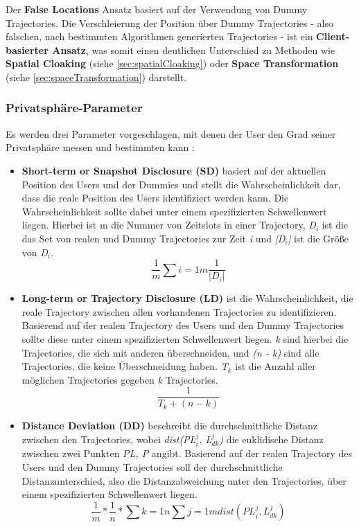Der \textbf{False Locations} Ansatz basiert auf der Verwendung von Dummy Trajectories. Die Verschleierung der Position über Dummy Trajectories - also falschen, nach bestimmten Algorithmen generierten Trajectories - ist ein \textbf{Client-basierter Ansatz}, was somit einen deutlichen Unterschied zu Methoden wie \textbf{Spatial Cloaking} (siehe \ref{sec:spatialCloaking}) oder \textbf{Space Transformation} (siehe \ref{sec:spaceTransformation}) darstellt.

\subsubsection{Privatsphäre-Parameter} \label{subsubsection:dgparameter}
Es werden drei Parameter vorgeschlagen, mit denen der User den Grad seiner Privatsphäre messen und bestimmten kann \cite{You2007, Lei2012}:
\begin{itemize}
	\item \textbf{Short-term or Snapshot Disclosure (SD)} basiert auf der aktuellen Position des Users und der Dummies und stellt die Wahrscheinlichkeit dar, dass die reale Position des Users identifiziert werden kann. Die Wahrscheinlichkeit sollte dabei unter einem spezifizierten Schwellenwert liegen. 
	Hierbei ist m die Nummer von Zeitslots in einer Trajectory, \textit{D$_{i}$} ist die das Set von realen und Dummy Trajectories zur Zeit \textit{i} und \textit{|D$_{i}$|} ist die Größe von \textit{D$_{i}$}.
	\begin{equation}
	\label{equation:SD}
	\frac{1}{m} \sum{i=1}{m}{\frac{1}{\left\lvert D_{i} \right\rvert}}
	\end{equation}	
	\item \textbf{Long-term or Trajectory Disclosure (LD)} ist die Wahrscheinlichkeit, die reale Trajectory zwischen allen vorhandenen Trajectories zu identifizieren. Basierend auf der realen Trajectory des Users und den Dummy Trajectories sollte diese unter einem spezifizierten Schwellenwert liegen. 
	\textit{k} sind hierbei die Trajectories, die sich mit anderen überschneiden, und \textit{(n - k)} sind alle Trajectories, die keine Überschneidung haben. \textit{T$_{k}$} ist die Anzahl aller möglichen Trajectories gegeben \textit{k} Trajectories.
	\begin{equation}
	\label{equation:LD}
	\frac{1}{T_{k} + \left( n - k \right)}
	\end{equation}	
	\item \textbf{Distance Deviation (DD)} beschreibt die durchschnittliche Distanz zwischen den Trajectories, wobei \textit{dist(PL$_{i}^{j}$, L$_{dk}^{j}$)} die euklidische Distanz zwischen zwei Punkten \textit{PL, P} angibt. Basierend auf der realen Trajectory des Users und den Dummy Trajectories soll der durchschnittliche Distanzunterschied, also die Distanzabweichung unter den Trajectories, über einem spezifizierten Schwellenwert liegen.
	\begin{equation}
	\label{equation:DD}
	\frac{1}{m} * \frac{1}{n} * \sum{k=1}{n}{\sum{j=1}{m}{dist\left(PL_{i}^{j}, L_{dk}^{j}\right)}}
	\end{equation}	
\end{itemize}

